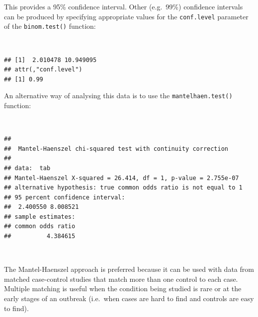 \documentclass[12pt,a4paper]{book}
\newenvironment{Shaded}{\begin{snugshade}}{\end{snugshade}}
\newcommand{\DataTypeTok}[1]{\textcolor[rgb]{0.13,0.29,0.53}{#1}}
\newcommand{\DecValTok}[1]{\textcolor[rgb]{0.00,0.00,0.81}{#1}}
\newcommand{\FloatTok}[1]{\textcolor[rgb]{0.00,0.00,0.81}{#1}}
\newcommand{\KeywordTok}[1]{\textcolor[rgb]{0.13,0.29,0.53}{\textbf{#1}}}
\newcommand{\NormalTok}[1]{#1}
\newcommand{\OperatorTok}[1]{\textcolor[rgb]{0.81,0.36,0.00}{\textbf{#1}}}
\newcommand{\StringTok}[1]{\textcolor[rgb]{0.31,0.60,0.02}{#1}}
\theoremstyle{definition}
\theoremstyle{definition}
\theoremstyle{definition}
\theoremstyle{remark}
\begin{document}
This provides a 95\% confidence interval. Other (e.g.~99\%) confidence
intervals can be produced by specifying appropriate values for the
\texttt{conf.level} parameter of the \texttt{binom.test()} function:

~

\begin{Shaded}
\end{Shaded}

\begin{verbatim}
## [1]  2.010478 10.949095
## attr(,"conf.level")
## [1] 0.99
\end{verbatim}

\newpage

An alternative way of analysing this data is to use the
\texttt{mantelhaen.test()} function:

~

\begin{Shaded}
\end{Shaded}

\begin{verbatim}
## 
##  Mantel-Haenszel chi-squared test with continuity correction
## 
## data:  tab
## Mantel-Haenszel X-squared = 26.414, df = 1, p-value = 2.755e-07
## alternative hypothesis: true common odds ratio is not equal to 1
## 95 percent confidence interval:
##  2.400550 8.008521
## sample estimates:
## common odds ratio 
##          4.384615
\end{verbatim}

~

The Mantel-Haenszel approach is preferred because it can be used with
data from matched case-control studies that match more than one control
to each case. Multiple matching is useful when the condition being
studied is rare or at the early stages of an outbreak (i.e.~when cases
are hard to find and controls are easy to find).
\end{document}
